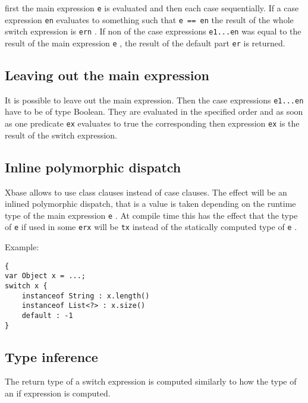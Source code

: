 \documentclass[a4paper,10pt]{scrreprt}
\begin{document}
first the main expression \lstinline{e}
 is evaluated and then each case sequentially. 
If a case expression \lstinline{en}
 evaluates to something such that \lstinline{e == en}
 the result of the whole switch expression is \lstinline{ern}
. If non of the 
case expressions \lstinline{e1...en}
 was equal to the result of the main expression \lstinline{e}
, the result of the default part \lstinline{er}
 is returned.




\subsection{Leaving out the main expression}

It is possible to leave out the main expression. Then the case expressions \lstinline{e1...en}
 have to be of type Boolean. They are evaluated 
in the specified order and as soon as one predicate \lstinline{ex}
 evaluates to true the corresponding then expression \lstinline{ex}
 is the result of the switch expression.




\subsection{Inline polymorphic dispatch}

Xbase allows to use class clauses instead of case clauses. The effect will be an inlined polymorphic dispatch, that is a value is taken depending on the runtime type of the main 
expression  \lstinline{e}
. At compile time this has the effect that the type of \lstinline{e}
 if used in some \lstinline{erx}
 will be \lstinline{tx}
 instead of the statically computed type of \lstinline{e}
. 

Example:
\begin{lstlisting}
{
var Object x = ...;
switch x {
	instanceof String : x.length()
	instanceof List<?> : x.size()
	default : -1
}

\end{lstlisting}





\subsection{Type inference}

The return type of a switch expression is computed similarly to how the type of an if expression is computed. 
\end{document}
